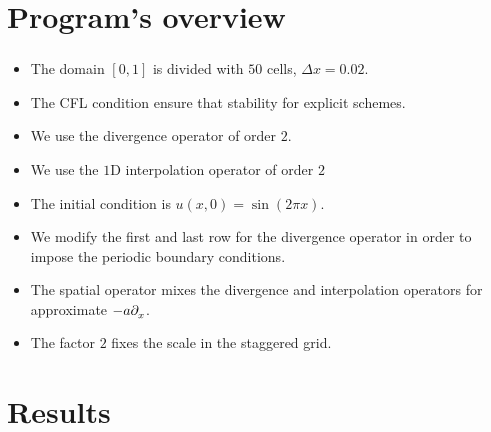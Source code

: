 \documentclass[
	8pt,
	professionalfonts,
	leqno,
	intlimits,
	c,
    aspectratio=1610,
]{beamer}
\begin{document}
\begin{frame}
    \frametitle{\secname}
    \begin{listing}[H]
        \tiny
        \centering
        \inputminted[frame=single,framesep=10pt,linenos,firstline=1,lastline=37,highlightlines={17,18}]{octave}{../examples/octave/hyperbolic1D.m}
    \end{listing}
\end{frame}

\begin{frame}
    \frametitle{\secname}
    \begin{listing}[H]
        \tiny
        \centering
        \inputminted[frame=single,framesep=10pt,linenos,firstline=41,lastline=57,highlightlines={52-54}]{octave}{../examples/octave/hyperbolic1D.m}
    \end{listing}
\end{frame}

\section{Program's overview}

\begin{frame}
    \frametitle{\secname}
    \begin{itemize}
        \item The domain $\left[0,1\right]$ is divided with $50$ cells, $\Delta x=0.02$.
        \item The CFL condition ensure that stability for explicit schemes.
        \item We use the divergence operator of order $2$.
        \item We use the $1$D interpolation operator of order $2$
        \item The initial condition is $u\left(x,0\right)=\sin\left(2\pi x\right)$.
        \item We modify the first and last row for the divergence operator in order to impose the periodic boundary conditions.
        \item The spatial operator mixes the divergence and interpolation operators for approximate $-a\difcp{}{x}$.
        \item The factor $2$ fixes the scale in the staggered grid.
    \end{itemize}
\end{frame}

\section{Results}
\end{document}
